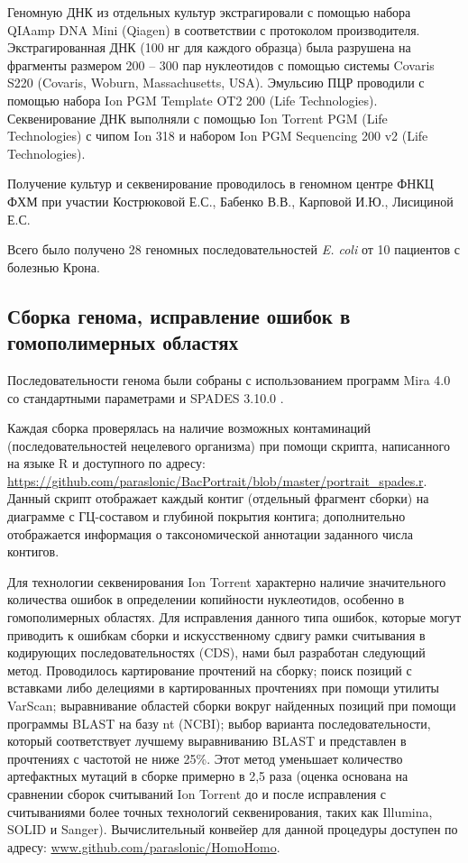 Геномную ДНК из отдельных культур экстрагировали с помощью набора QIAamp DNA Mini (Qiagen) в соответствии с протоколом производителя. Экстрагированная ДНК (100 нг для каждого образца) была разрушена на фрагменты размером 200 – 300 пар нуклеотидов с помощью системы Covaris S220 (Covaris, Woburn, Massachusetts, USA). Эмульсию ПЦР проводили с помощью набора Ion PGM Template OT2 200 (Life Technologies). Секвенирование ДНК выполняли с помощью Ion Torrent PGM (Life Technologies) с чипом Ion 318 и набором Ion PGM Sequencing 200 v2 (Life Technologies). 

Получение культур и секвенирование проводилось в геномном центре ФНКЦ ФХМ при участии Кострюковой Е.С., Бабенко В.В., Карповой И.Ю., Лисициной Е.С.

Всего было получено 28 геномных последовательностей \textit{E. coli} от 10 пациентов с болезнью Крона.

\subsection{Сборка генома, исправление ошибок в гомополимерных областях}
Последовательности генома были собраны с использованием программ Mira 4.0 \cite{chevreux1999genome} со стандартными параметрами и SPADES 3.10.0 \cite{bankevich2012spades}.

Каждая сборка проверялась на наличие возможных контаминаций (последовательностей нецелевого организма) при помощи скрипта, написанного на языке R и доступного по адресу: \url{https://github.com/paraslonic/BacPortrait/blob/master/portrait\_spades.r}. Данный скрипт отображает каждый контиг (отдельный фрагмент сборки) на диаграмме с ГЦ-составом и глубиной покрытия контига; дополнительно отображается информация о таксономической аннотации заданного числа контигов. 
 
Для технологии секвенирования Ion Torrent характерно наличие значительного количества ошибок в определении копийности нуклеотидов, особенно в гомополимерных областях. Для исправления данного типа ошибок, которые могут приводить к ошибкам сборки и искусственному сдвигу рамки считывания в кодирующих последовательностях (CDS), нами был разработан следующий метод. Проводилось картирование прочтений на сборку; поиск позиций с вставками либо делециями в картированных прочтениях при помощи утилиты VarScan; выравнивание областей сборки вокруг найденных позиций при помощи программы BLAST на базу nt (NCBI); выбор варианта последовательности, который соответствует лучшему выравниванию BLAST и представлен в прочтениях с частотой не ниже 25\%. Этот метод уменьшает количество артефактных мутаций в сборке примерно в 2,5 раза (оценка основана на сравнении сборок считываний Ion Torrent до и после исправления с считываниями более точных технологий секвенирования, таких как Illumina, SOLID и Sanger). Вычислительный конвейер для данной процедуры доступен по адресу: \url{www.github.com/paraslonic/HomoHomo}.

